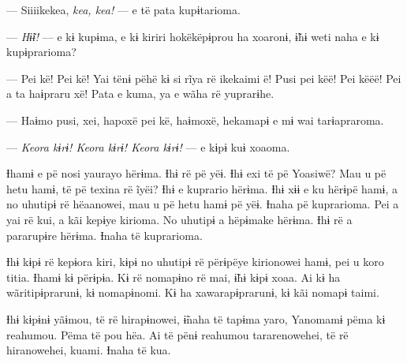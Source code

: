 
--- Siiiikekea, \textit{kea, kea!} --- e të pata kupɨtarioma. 

--- \textit{Hɨ̃ɨ!} --- e kɨ kupɨma, e kɨ kiriri hokëkëpɨprou ha xoaronɨ, ɨ̃hɨ weti
naha e kɨ kupɨprarioma?

--- Pei kë! Pei kë! Yai tënɨ pëhë kɨ si rĩya rë ikekaimi ë! Pusi pei
këë! Pei këëë! Pei a ta haɨpraru xë! Pata e kuma, ya e wãha rë
yuprarɨhe.

--- Haɨmo pusi, xei, hapoxë pei kë, haɨmoxë, hekamapɨ e mɨ wai
tarɨapraroma. 

--- \textit{Keora kɨrɨ! Keora kɨrɨ! Keora kɨrɨ!} --- e kɨpɨ kuɨ xoaoma. 


Ɨhamɨ e pë nosi yaurayo hërɨma. Ɨhɨ rë pë yëɨ. Ɨhɨ exi të pë Yoasiwë?
Mau u pë hetu hamɨ, të pë texina rë ĩyëi? Ɨhɨ e kuprario hërɨma. Ɨhɨ xɨɨ
e ku hërɨpë hamɨ, a no uhutipɨ rë hëaanowei, mau u pë hetu hamɨ pë yëɨ.
Ɨnaha pë kuprarioma. Pei a yai rë kui, a kãi kepɨye kirioma. No uhutipɨ
a hëpɨmake hërɨma. Ɨhɨ rë a pararupɨre hërɨma. Ɨnaha të kuprarioma. 

Ɨhɨ kɨpɨ rë kepɨora kiri, kɨpɨ no uhutipɨ rë përɨpëye kirionowei hamɨ,
pei u koro titia. Ɨhamɨ kɨ përɨpɨa. Kɨ rë nomapɨno rë mai, ɨ̃hɨ kɨpɨ
xoaa. Ai kɨ ha wãritipɨprarunɨ, kɨ nomapɨnomi. Kɨ ha xawarapɨprarunɨ, kɨ
kãi nomapɨ taimi. 

Ɨhɨ kɨpɨnɨ yãɨmou, të rë hirapɨnowei, ɨ̃naha të tapɨma yaro, Yanomamɨ
pëma kɨ reahumou. Pëma të pou hëa. Ai të pënɨ reahumou tararenowehei, të
rë hiranowehei, kuami. Ɨnaha të kua.
